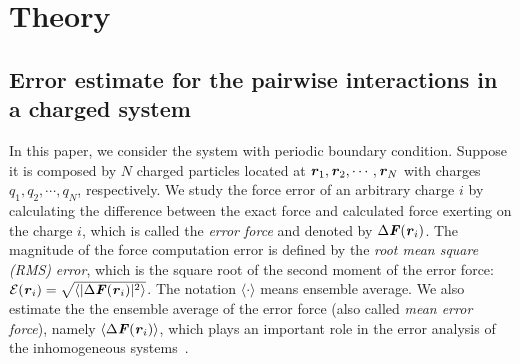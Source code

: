 \documentclass[aps,pre,preprint,unsortedaddress]{revtex4}
\renewcommand{\v}[1]{\textbf{\textit{#1}}}
\begin{document}



\section{Theory}

\subsection{Error estimate for
  the pairwise interactions in a charged system}

In this paper, we consider the system with periodic boundary condition.
Suppose it is
composed by $N$ charged particles located at $\v r_1, \v r_2, \cdots,
\v r_N$ with charges $q_1, q_2, \cdots, q_N$, respectively.  We study
the force error of an arbitrary charge $i$ by calculating the
difference between the exact force and calculated force exerting on
the charge $i$, which is called the \emph{error force}
\cite{wang2012} and denoted by $\Delta \v F(\v r_i)$.
The magnitude of the force computation error 
is defined by the \emph{root mean square (RMS)} \emph{error}, which is
the square root of the second moment of the error force: $\mathcal
E(\v r_i) = \sqrt{\langle\vert\Delta\v F(\v r_i)\vert^2\rangle}$.  The
notation $\langle\cdot\rangle$ means ensemble average.  We also
estimate the the ensemble average of the error force (also called
\emph{mean error force}), namely $\langle\Delta\v F(\v r_i)\rangle$,
which plays an important role in the error analysis of the
inhomogeneous systems~\cite{wang2012}.
\end{document}
